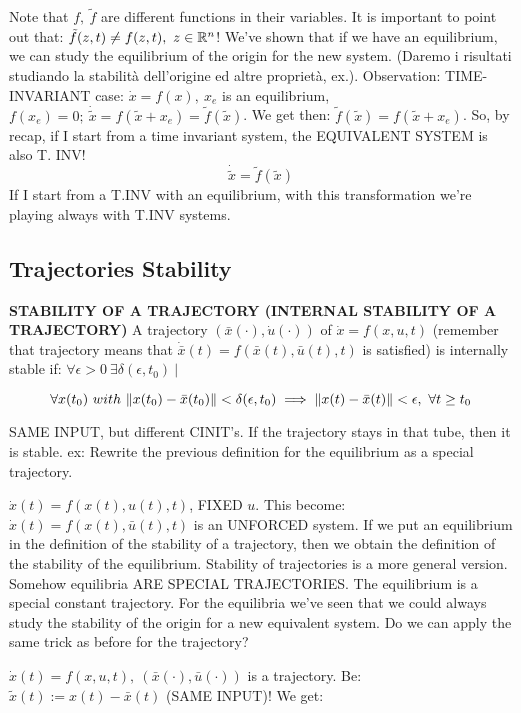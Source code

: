Note that $f,\ \tilde{f}$ are different functions in their variables. It is important to point out that: $\tilde{f}(z,t) \neq f(z,t),\ z \in \mathbb{R}^n$! We've shown that if we have an equilibrium, we can study the equilibrium of the origin for the new system. (Daremo i risultati studiando la stabilità dell'origine ed altre proprietà, ex.). Observation: TIME-INVARIANT case:
$\dot{x}=f(x),\ x_e$ is an equilibrium, $f(x_e) = 0;\ \dot{\tilde{x}} = f(\tilde{x}+x_e) = \tilde{f}(\tilde{x})$. We get then: $\tilde{f}(\tilde{x}) = f(\tilde{x}+x_e)$. So, by recap, if I start from a time invariant system, the EQUIVALENT SYSTEM is also T. INV!
\[
	\dot{\tilde{x}} = \tilde{f}(\tilde{x})
\]
If I start from a T.INV with an equilibrium, with this transformation we're playing always with T.INV systems.

\subsection{Trajectories Stability}

\begin{defn}{\textbf{STABILITY OF A TRAJECTORY (INTERNAL STABILITY OF A TRAJECTORY)}}
A trajectory $(\bar{x}(\mathord{\cdot}),\dot{u}(\mathord{\cdot}))$ of $\dot{x}=f(x,u,t)$ (remember that trajectory means that $\dot{\bar{x}}(t) = f(\bar{x}(t),\bar{u}(t),t)$ is satisfied) is internally stable if: $\forall \epsilon > 0\ \exists \delta(\epsilon,t_0)\ |$

\[
	\forall x(t_0)\ with\ \norma{x(t_0)-\bar{x}(t_0)} < \delta(\epsilon,t_0) \implies \norma{x(t)-\bar{x}(t)} < \epsilon,\ \forall t \geq t_0
\]
\end{defn}

SAME INPUT, but different CINIT's. If the trajectory stays in that tube, then it is stable. ex: Rewrite the previous definition for the equilibrium as a special trajectory.

$\dot{x}(t) = f(x(t),u(t),t)$, FIXED $u$. This become: $\dot{x}(t) = f(x(t),\bar{u}(t),t)$ is an UNFORCED system. If we put an equilibrium in the definition of the stability of a trajectory, then we obtain the definition of the stability of the equilibrium. Stability of trajectories is a more general version. Somehow equilibria ARE SPECIAL TRAJECTORIES. The equilibrium is a special constant trajectory.
For the equilibria we've seen that we could always study the stability of the origin for a new equivalent system. Do we can apply the same trick as before for the trajectory?

$\dot{x}(t) = f(x,u,t),\ (\bar{x}(\mathord{\cdot}),\bar{u}(\mathord{\cdot}))$ is a trajectory. Be: $\tilde{x}(t) := x(t) - \bar{x}(t)$ (SAME INPUT)! We get:

